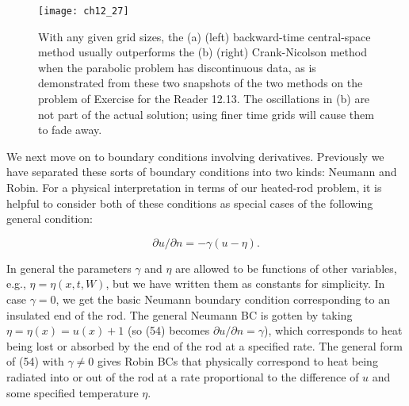 \documentclass[../main.tex]{subfiles}
\begin{document}
\begin{figure}[H]
	\centering
	\texttt{[image: ch12\_27]}
	\caption{\textsf{With any given grid sizes, the (a) (left) backward-time central-space method usually outperforms the (b) (right) Crank-Nicolson method when the parabolic problem has discontinuous data, as is demonstrated from these two snapshots of the two methods on the problem of Exercise for the Reader 12.13. The oscillations in (b) are not part of the actual solution; using finer time grids will cause them to fade away.}}
	\label{pfig:ch12_27}
\end{figure}
We next move on to boundary conditions involving derivatives. Previously we have separated these sorts of boundary conditions into two kinds: Neumann and Robin. For a physical interpretation in terms of our heated-rod problem, it is helpful to consider both of these conditions as special cases of the following general condition: 

\begin{equation}
\partial u/\partial n= -\gamma(u-\eta).
\end{equation}

In general the parameters $\gamma$ and $\eta$ are allowed to be functions of other variables, e.g., $\eta = \eta(x,t,W)$, but we have written them as constants for simplicity. In case $\gamma = 0$, we get the basic Neumann boundary condition corresponding to an insulated end of the rod. The general Neumann BC is gotten by taking  $\eta= \eta(x) = u(x) +1$ (so (54) becomes $\partial u/\partial n= \gamma$), which corresponds to heat being lost or absorbed by the end of the rod at a specified rate. The general form of (54) with $\gamma \neq 0$ gives Robin BCs that physically correspond to heat being radiated into or out of the rod at a rate proportional to the difference of $u$ and some specified temperature $\eta$.
\end{document}
